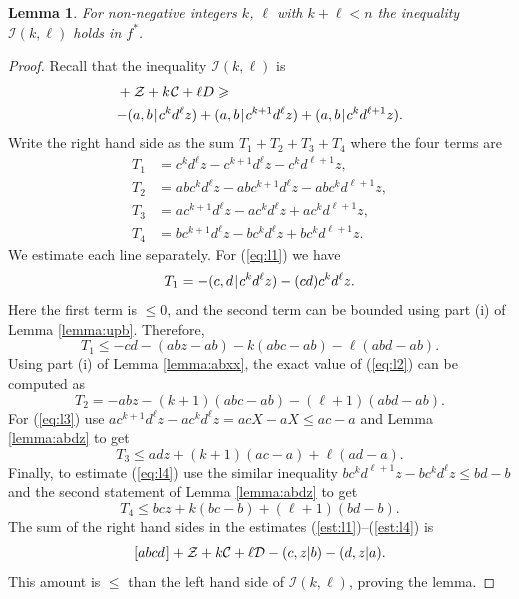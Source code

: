 \documentclass[reqno]{amsart}
\newtheorem{lemma}[theorem]{Lemma}
\theoremstyle{definition}
\newcommand\tsp{\mkern 1.5mu}
\def\|{\mkern1.5mu{|}\mkern1.5mu}
\renewcommand\ge{\geqslant}\renewcommand\le{\leqslant}
\newcommand\C{\mathcal C}
\newcommand\D{\mathcal D}
\newcommand\I{\mathcal I} %
\newcommand\Z{\mathcal Z} %
\def\abcd{[abcd\tsp]}
\begin{document}
\begin{lemma}\label{lemma:indhyp}
For non-negative integers $k$, $\ell$ with $k+\ell<n$ the inequality
$\I(k,\ell)$ holds in $f^*$.
\end{lemma}
\begin{proof}
Recall that the inequality $\I(k,\ell)$ is
\begin{align*}
   \abcd &+ \Z+k\tsp\C +\ell D \ge {}\\
    &{-(a,b\|c^kd^\ell z)} + (a,b\|c^{k+1}d^\ell z)
       + (a,b\|c^kd^{\ell+1}z).
\end{align*}
Write the right hand side as the sum $T_1+T_2+T_3+T_4$ where the four terms are
\begin{align}
  T_1 &= c^kd^\ell z - c^{k+1}d^\ell z - c^kd^{\ell+1}z, \label{eq:l1} \\
  T_2 &= abc^kd^\ell z - abc^{k+1}d^\ell z - abc^kd^{\ell+1}z, \label{eq:l2}\\
  T_3 &= ac^{k+1}d^\ell z - ac^kd^\ell z + ac^kd^{\ell+1}z, \label{eq:l3}\\
  T_4 &= bc^{k+1}d^\ell z - bc^kd^\ell z + bc^kd^{\ell+1}z. \label{eq:l4}
\end{align}
We estimate each line separately. For (\ref{eq:l1}) we have
$$
    T_1 = -(c,d\|c^kd^\ell z) - (cd) c^k d^\ell z.
$$
Here the first term is ${}\le 0$, and the second term can be bounded using
part (i) of Lemma \ref{lemma:upb}. Therefore,
\begin{equation}\label{est:l1}
    T_1 \le -cd -(abz-ab) - k(abc-ab)-\ell(abd-ab).
\end{equation}
Using part (i) of Lemma \ref{lemma:abxx}, the exact value of (\ref{eq:l2})
can be computed as
\begin{equation}\label{est:l2}
   T_2 = -abz - (k+1)(abc-ab) - (\ell+1)(abd-ab).
\end{equation}
For (\ref{eq:l3}) use $ac^{k+1}d^\ell z -
ac^kd^\ell z = acX-aX \le ac-a$ and Lemma \ref{lemma:abdz} to get
\begin{equation}\label{est:l3}
   T_3\le adz+(k+1)(ac-a)+\ell(ad-a).
\end{equation}
Finally, to estimate (\ref{eq:l4}) use the similar inequality
$bc^kd^{\ell+1} z - bc^kd^\ell z \le
bd-b$ and the second statement of Lemma
\ref{lemma:abdz} to get
\begin{equation}\label{est:l4}
   T_4\le bcz + k(bc-b)+(\ell+1)(bd-b).
\end{equation}
The sum of the right hand sides in the estimates (\ref{est:l1})--(\ref{est:l4}) is
$$
   \abcd+\Z + k\C + \ell\D -(c,z|b)-(d,z|a).
$$
This amount is $\le$ than the left hand side of $\I(k,\ell)$,
proving the lemma.
\end{proof}
\end{document}
